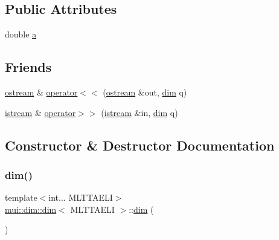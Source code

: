 \subsection*{Public Attributes}
\begin{DoxyCompactItemize}
\item 
double \hyperlink{structmui_1_1dim_1_1dim_a40ca9d786e371cc4dd9c125fa99980e6}{a}
\end{DoxyCompactItemize}
\subsection*{Friends}
\begin{DoxyCompactItemize}
\item 
\hyperlink{classmui_1_1ostream}{ostream} \& \hyperlink{structmui_1_1dim_1_1dim_a3e283b43c057fa9d4ffa33f88c7bb7fd}{operator$<$$<$} (\hyperlink{classmui_1_1ostream}{ostream} \&out, \hyperlink{structmui_1_1dim_1_1dim}{dim} q)
\item 
\hyperlink{classmui_1_1istream}{istream} \& \hyperlink{structmui_1_1dim_1_1dim_a933072e8c2019385aba3cbfcd6469186}{operator$>$$>$} (\hyperlink{classmui_1_1istream}{istream} \&in, \hyperlink{structmui_1_1dim_1_1dim}{dim} q)
\end{DoxyCompactItemize}


\subsection{Constructor \& Destructor Documentation}
\mbox{\label{structmui_1_1dim_1_1dim_ad5222f9fcfd07db9c132003b4544ff76}} 
\subsubsection{\texorpdfstring{dim()}{dim()}\hspace{0.1cm}{\footnotesize\ttfamily [1/4]}}
{\footnotesize\ttfamily template$<$int... M\+L\+T\+T\+A\+E\+LI$>$ \\
\hyperlink{structmui_1_1dim_1_1dim}{mui\+::dim\+::dim}$<$ M\+L\+T\+T\+A\+E\+LI $>$\+::\hyperlink{structmui_1_1dim_1_1dim}{dim} (\begin{DoxyParamCaption}{ }\end{DoxyParamCaption})\hspace{0.3cm}{\ttfamily [inline]}}

\mbox{\label{structmui_1_1dim_1_1dim_a8a9104f25986d886cdd98a3e8abdd65d}} 
